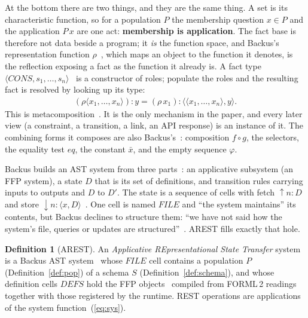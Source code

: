 \documentclass[10pt,twocolumn]{article}
\theoremstyle{plain}
\theoremstyle{definition}
\newtheorem{definition}{Definition}
\begin{document}
At the bottom there are two things, and they are the same thing. A set is its characteristic function, so for a population $P$ the membership question $x \in P$ and the application $P\,x$ are one act: \textbf{membership is application}. The fact base is therefore not data beside a program; it \emph{is} the function space, and Backus's representation function $\rho$~\cite[Sec.\,13.3]{backus78}, which maps an object to the function it denotes, is the reflection exposing a fact as the function it already is. A fact type $\langle\mathit{CONS}, s_1, \ldots, s_n\rangle$~\cite[Sec.\,11.2.4]{backus78} is a constructor of roles; populate the roles and the resulting fact is resolved by looking up its type:
\begin{align}
(\rho\langle x_1, \ldots, x_n\rangle)\!:\!y = (\rho\,x_1)\!:\!\langle\langle x_1, \ldots, x_n\rangle, y\rangle. \label{eq:metacomp}
\end{align}
This is metacomposition~\cite[Sec.\,13.3.2]{backus78}. It is the only mechanism in the paper, and every later view (a constraint, a transition, a link, an API response) is an instance of it. The combining forms it composes are also Backus's~\cite[Sec.\,11.2.4]{backus78}: composition $f\circ g$, the selectors, the equality test $\mathit{eq}$, the constant $\bar{x}$, and the empty sequence $\varphi$.

\smallskip\noindent Backus builds an AST system from three parts~\cite[Sec.\,14.3]{backus78}: an applicative subsystem (an FFP system), a state $D$ that is its set of definitions, and transition rules carrying inputs to outputs and $D$ to $D'$. The state is a sequence of cells with fetch $\uparrow\!n\!:\!D$ and store $\downarrow\!n\!:\!\langle x, D\rangle$~\cite[Secs.\,13.3.4,\,14.3]{backus78}. One cell is named $\mathit{FILE}$ and ``the system maintains'' its contents, but Backus declines to structure them: ``we have not said how the system's file, queries or updates are structured''~\cite[Sec.\,14.4.4]{backus78}. AREST fills exactly that hole.

\begin{definition}[AREST]\label{def:arest}
An \emph{Applicative REpresentational State Transfer} system is a Backus AST system~\cite[Sec.\,14]{backus78} whose $\mathit{FILE}$ cell contains a population $P$ (Definition~\ref{def:pop}) of a schema $S$ (Definition~\ref{def:schema}), and whose definition cells $\mathit{DEFS}$ hold the FFP objects~\cite[Sec.\,13]{backus78} compiled from FORML\,2 readings together with those registered by the runtime. REST operations are applications of the system function~(\ref{eq:sys}).
\end{definition}
\end{document}

